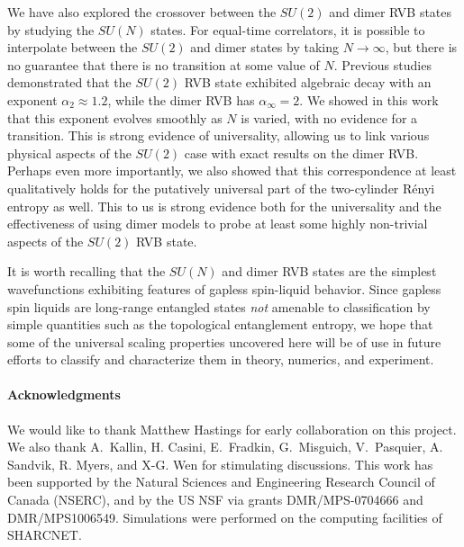 \documentclass[11pt]{iopart}
\begin{document}
We have also explored the crossover between the $SU(2)$ and dimer RVB states by studying the $SU(N)$ states. For equal-time correlators, it is possible to interpolate between the $SU(2)$ and dimer states by taking $N \rightarrow \infty$, but there is no guarantee that there is no transition at some value of $N$.  Previous studies demonstrated that the $SU(2)$ RVB state exhibited algebraic decay with an exponent $\alpha_2 \approx 1.2$, while the dimer RVB has $\alpha_{\infty} = 2$.  We showed in this work that this exponent evolves smoothly as $N$ is varied, with no evidence for a transition.  
This is strong evidence of universality, allowing us to link various physical aspects of the $SU(2)$ case with exact results on the dimer RVB. Perhaps even more importantly, we also showed that this correspondence at least qualitatively holds for the putatively universal part of the two-cylinder R\'enyi entropy as well. This to us is strong evidence both for the universality and the effectiveness of using dimer models to probe at least some {highly non-trivial} aspects of the $SU(2)$ RVB state.



It is worth recalling that the $SU(N)$ and dimer RVB states are the simplest wavefunctions exhibiting features of gapless spin-liquid behavior. Since gapless spin liquids are long-range entangled states {\it not} amenable to  classification by simple quantities such as the topological entanglement entropy, we hope that some of the universal scaling properties uncovered here will be of use in future efforts to classify and characterize them in theory, numerics, and experiment.





\paragraph{Acknowledgments}
 We would like to thank Matthew Hastings for early collaboration on this project. We also thank  A.\ Kallin, H. Casini, E.\ Fradkin, G.\ Misguich, V.\  Pasquier, A. Sandvik, R. Myers, and X-G. Wen for stimulating discussions. This work has been supported by the Natural Sciences and Engineering
Research Council of Canada (NSERC), and by the US NSF via grants DMR/MPS-0704666 and DMR/MPS1006549.   Simulations were performed on the computing facilities of SHARCNET.

 \appendix
 \clearpage
\end{document}
